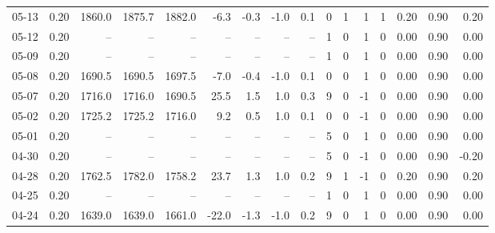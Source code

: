 \begin{threeparttable}
{\begin{tabular}{lrrrrrrrrrrrrrrr}
  05-13 &     0.20 & 1860.0 & 1875.7 & 1882.0 &       -6.3 &           -0.3 &                     -1.0 &                 0.1 &              0 &         1 &     1 &         1 &       0.20 &      0.90 &           0.20 \\
  05-12 &     0.20 &     -- &     -- &     -- &         -- &             -- &                       -- &                  -- &              1 &         0 &     1 &         0 &       0.00 &      0.90 &           0.00 \\
  05-09 &     0.20 &     -- &     -- &     -- &         -- &             -- &                       -- &                  -- &              1 &         0 &     1 &         0 &       0.00 &      0.90 &           0.00 \\
  05-08 &     0.20 & 1690.5 & 1690.5 & 1697.5 &       -7.0 &           -0.4 &                     -1.0 &                 0.1 &              0 &         0 &     1 &         0 &       0.00 &      0.90 &           0.00 \\
  05-07 &     0.20 & 1716.0 & 1716.0 & 1690.5 &       25.5 &            1.5 &                      1.0 &                 0.3 &              9 &         0 &    -1 &         0 &       0.00 &      0.90 &           0.00 \\
  05-02 &     0.20 & 1725.2 & 1725.2 & 1716.0 &        9.2 &            0.5 &                      1.0 &                 0.1 &              0 &         0 &    -1 &         0 &       0.00 &      0.90 &           0.00 \\
  05-01 &     0.20 &     -- &     -- &     -- &         -- &             -- &                       -- &                  -- &              5 &         0 &     1 &         0 &       0.00 &      0.90 &           0.00 \\
  04-30 &     0.20 &     -- &     -- &     -- &         -- &             -- &                       -- &                  -- &              5 &         0 &    -1 &         0 &       0.00 &      0.90 &          -0.20 \\
  04-28 &     0.20 & 1762.5 & 1782.0 & 1758.2 &       23.7 &            1.3 &                      1.0 &                 0.2 &              9 &         1 &    -1 &         0 &       0.20 &      0.90 &           0.20 \\
  04-25 &     0.20 &     -- &     -- &     -- &         -- &             -- &                       -- &                  -- &              1 &         0 &     1 &         0 &       0.00 &      0.90 &           0.00 \\
  04-24 &     0.20 & 1639.0 & 1639.0 & 1661.0 &      -22.0 &           -1.3 &                     -1.0 &                 0.2 &              9 &         0 &     1 &         0 &       0.00 &      0.90 &           0.00 \\

\end{tabular}}
\end{threeparttable}
